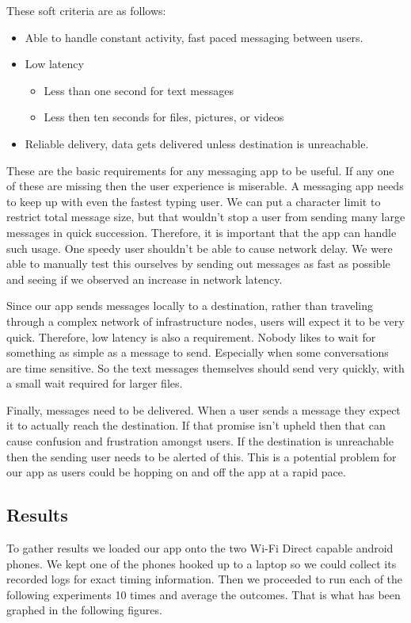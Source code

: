 \documentclass[10pt]{article}
\begin{document}
These soft criteria are as follows:
\begin{itemize}
    \item Able to handle constant activity, fast paced messaging between users.
    \item Low latency
          \begin{itemize}
              \item Less than one second for text messages
              \item Less then ten seconds for files, pictures, or videos
          \end{itemize}
    \item Reliable delivery, data gets delivered unless destination is unreachable.
\end{itemize}
These are the basic requirements for any messaging app to be useful. If any one of these are missing then the user experience is miserable.
A messaging app needs to keep up with even the fastest typing user. We can put a character limit to restrict total message size, but that wouldn't stop a user from sending many large messages in quick succession. Therefore, it is important that the app can handle such usage. One speedy user shouldn't be able to cause network delay. We were able to manually test this ourselves by sending out messages as fast as possible and seeing if we observed an increase in network latency.

Since our app sends messages locally to a destination, rather than traveling through a complex network of infrastructure nodes, users will expect it to be very quick. Therefore, low latency is also a requirement. Nobody likes to wait for something as simple as a message to send. Especially when some conversations are time sensitive. So the text messages themselves should send very quickly, with a small wait required for larger files.

Finally, messages need to be delivered. When a user sends a message they expect it to actually reach the destination. If that promise isn't upheld then that can cause confusion and frustration amongst users. If the destination is unreachable then the sending user needs to be alerted of this. This is a potential problem for our app as users could be hopping on and off the app at a rapid pace.

\subsection{Results}

To gather results we loaded our app onto the two Wi-Fi Direct capable android phones. We kept one of the phones hooked up to a laptop so we could collect its recorded logs for exact timing information. Then we proceeded to run each of the following experiments 10 times and average the outcomes. That is what has been graphed in the following figures.
\end{document}
